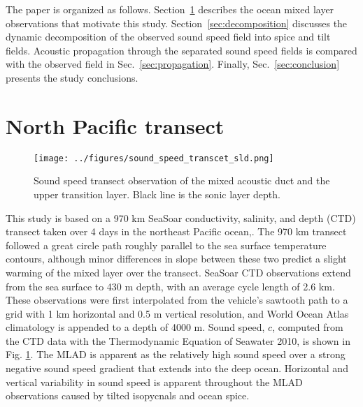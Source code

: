 \documentclass[preprint,NumberedRefs]{JASA}
\begin{document}
The paper is organized as follows. Section~\ref{sec:transcet} describes the ocean mixed layer observations that motivate this study. Section~\ref{sec:decomposition} discusses the dynamic decomposition of the observed sound speed field into spice and tilt fields. Acoustic propagation through the separated sound speed fields is compared with the observed field in Sec.~\ref{sec:propagation}. Finally, Sec.~\ref{sec:conclusion} presents the study conclusions.

\section{North Pacific transect}\label{sec:transcet}
\begin{figure}
\texttt{[image: ../figures/sound\_speed\_transcet\_sld.png]}
\caption{\label{fig:c_grid}{Sound speed transect observation of the mixed acoustic duct and the upper transition layer. Black line is the sonic layer depth.}}
\end{figure}

This study is based on a 970 km SeaSoar conductivity, salinity, and depth (CTD) transect taken over 4 days in the northeast Pacific ocean,\citep{cole2010seasonal, colosi2020observations}. The 970 km transect followed a great circle path roughly parallel to the sea surface temperature contours, although minor differences in slope between these two predict a slight warming of the mixed layer over the transect. SeaSoar CTD observations extend from the sea surface to 430 m depth, with an average cycle length of 2.6 km. These observations were first interpolated from the vehicle's sawtooth path to a grid with 1 km horizontal and 0.5 m vertical resolution\citep{colosi2020observations}, and World Ocean Atlas climatology is appended to a depth of 4000 m\citep{WOA}. Sound speed, $c$, computed from the CTD data with the Thermodynamic Equation of Seawater 2010,\cite{TEOS10} is shown in Fig. \ref{fig:c_grid}. The MLAD is apparent as the relatively high sound speed over a strong negative sound speed gradient that extends into the deep ocean. Horizontal and vertical variability in sound speed is apparent throughout the MLAD observations caused by tilted isopycnals and ocean spice\citep{colosi2020observations}.
\end{document}
